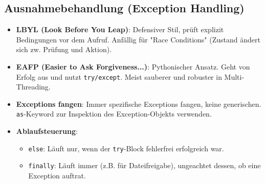 \subsection{Ausnahmebehandlung (Exception Handling)}
\begin{itemize}
    \item \textbf{LBYL (Look Before You Leap)}: Defensiver Stil, prüft explizit Bedingungen vor dem Aufruf. Anfällig für "Race Conditions" (Zustand ändert sich zw. Prüfung und Aktion).
    \item \textbf{EAFP (Easier to Ask Forgiveness...)}: Pythonischer Ansatz. Geht von Erfolg aus und nutzt \texttt{try/except}. Meist sauberer und robuster in Multi-Threading.
    \item \textbf{Exceptions fangen}: Immer spezifische Exceptions fangen, keine generischen. \texttt{as}-Keyword zur Inspektion des Exception-Objekts verwenden.
    \item \textbf{Ablaufsteuerung}:
    \begin{itemize}
        \item \texttt{else}: Läuft nur, wenn der \texttt{try}-Block fehlerfrei erfolgreich war.
        \item \texttt{finally}: Läuft immer (z.B. für Dateifreigabe), ungeachtet dessen, ob eine Exception auftrat.
    \end{itemize}
\end{itemize}

